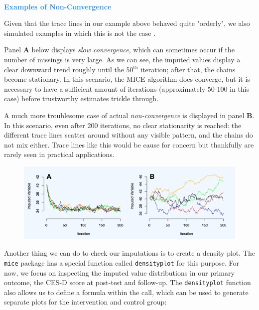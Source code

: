 \begin{box-info} \\

\vspace{2mm}

\textcolor{dodgerblue}{\textbf{Examples of Non-Convergence}} 

\vspace{2mm}

Given that the trace lines in our example above behaved quite "orderly", we also simulated examples in which this is not the case \citep[cf.][chap. 4.5.7]{fimd}. \vspace{2mm}

\hspace*{5mm} Panel \textsf{\textbf{A}} below displays \emph{slow convergence}, which can sometimes occur if the number of missings is very large. As we can see, the imputed values display a clear downward trend roughly until the 50$^\text{th}$ iteration; after that, the chains become stationary. In this scenario, the \textsf{MICE} algorithm does converge, but it is necessary to have a sufficient amount of iterations (approximately 50-100 in this case) before trustworthy estimates trickle through. \vspace{2mm}

\hspace*{5mm} A much more troublesome case of actual \emph{non-convergence} is displayed in panel \textsf{\textbf{B}}. In this scenario, even after 200 iterations, no clear stationarity is reached: the different trace lines scatter around without any visible pattern, and the chains do not mix either. Trace lines like this would be cause for concern but thankfully are rarely seen in practical applications.

\begin{figure}[H]
\includegraphics[width=12cm]{images/convergence.png}
\centering
\end{figure}

\end{box-info}


Another thing we can do to check our imputations is to create a density plot. The \texttt{mice} package has a special function called \texttt{densityplot} for this purpose. For now, we focus on inspecting the imputed value distributions in our primary outcome, the CES-D score at post-test and follow-up. The \texttt{densityplot} function also allows us to define a formula within the call, which can be used to generate separate plots for the intervention and control group:

